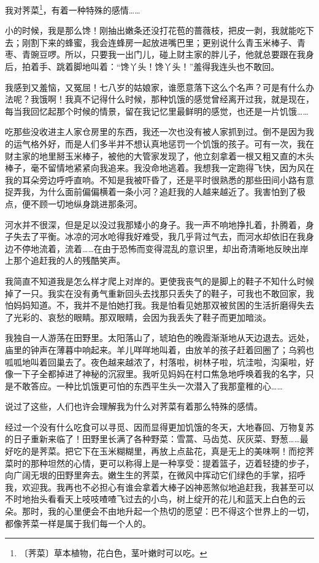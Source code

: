 \documentclass[12pt,UTF-8,openany]{ctexbook}
\begin{document}
\begin{normalsize}
    
    我对荠菜\footnote{〔荠菜〕草本植物，花白色，茎叶嫩时可以吃。}，有着一种特殊的感情……
    
    小的时候，我是那么馋！刚抽出嫩条还没打花苞的蔷薇枝，把皮一剥，我就能吃下去；刚割下来的蜂蜜，我会连蜂房一起放进嘴巴里；更别说什么青玉米棒子、青枣、青豌豆啰。所以，只要我一出门儿，碰上财主家的胖儿子，他就总要跟在我身后，拍着手、跳着脚地叫着：“馋丫头！馋丫头！”羞得我连头也不敢回。
    
    我感到又羞恼，又冤屈！七八岁的姑娘家，谁愿意落下这么个名声？可是有什么办法呢？我饿啊！我真不记得什么时候，那种饥饿的感觉曾经离开过我，就是现在，每当我回忆起那个时候的情景，留在我记忆里最鲜明的感觉，也还是一片饥饿……
    
    吃那些没收进主人家仓房里的东西，我还一次也没有被人家抓到过。倒不是因为我的运气格外好，而是人们多半并不想认真地惩罚一个饥饿的孩子。可有一次，我在财主家的地里掰玉米棒子，被他的大管家发现了，他立刻拿着一根又粗又直的木头棒子，毫不留情地紧紧向我追来。我没命地逃着。我想我一定跑得飞快，因为风在我的耳朵旁边呼呼直响。不知是我被吓昏了，还是平时很熟悉的那些田间小路有意捉弄我，为什么面前偏偏横着一条小河？追赶我的人越来越近了。我害怕到了极点，便不顾一切地纵身跳进那条河。
    
    河水并不很深，但是足以没过我那矮小的身子。我一声不响地挣扎着，扑腾着，身子失去了平衡。冰凉的河水呛得我好难受，我几乎背过气去，而河水却依旧在我身边不停地流着，流着……在由于恐怖而变得混乱的意识里，却出奇清晰地反映出岸上那个追赶我的人的残酷笑声。
    
    我简直不知道我是怎么样才爬上对岸的。更使我丧气的是脚上的鞋子不知什么时候掉了一只。我实在没有勇气重新回头去找那只丢失了的鞋子，可我也不敢回家，我怕妈妈知道。不，我并不是怕她打我。我是怕看见她那双被贫困的生活折磨得失去了光彩的、哀愁的眼睛。那双眼睛，会因为我丢失了鞋子而更加暗淡。
    
    我独自一人游荡在田野里。太阳落山了，琥珀色的晚霞渐渐地从天边退去。远处，庙里的钟声在薄暮中响起来。羊儿咩咩地叫着，由放羊的孩子赶着回圈了；乌鸦也呱呱地叫着回巢去了。夜色越来越浓了，村落啦，树林子啦，坑洼啦，沟渠啦，好像一下子全都掉进了神秘的沉寂里。我听见妈妈在村口焦急地呼唤着我的名字，只是不敢答应。一种比饥饿更可怕的东西平生头一次潜入了我那童稚的心……
    
    说过了这些，人们也许会理解我为什么对荠菜有着那么特殊的感情。
    
    经过一个没有什么吃食可以寻觅、因而显得更加饥饿的冬天，大地春回、万物复苏的日子重新来临了！田野里长满了各种野菜：雪蒿、马齿苋、灰灰菜、野葱……最好吃的是荠菜。把它下在玉米糊糊里，再放上点盐花，真是无上的美味啊！而挖荠菜时的那种坦然的心情，更可以称得上是一种享受：提着篮子，迈着轻捷的步子，向广阔无垠的田野里奔去。嫩生生的荠菜，在微风中挥动它们绿色的手掌，招呼我，欢迎我。我再也不必担心有谁会拿着大棒子凶神恶煞似地追赶我，我甚至可以不时地抬头看看天上吱吱喳喳飞过去的小鸟，树上绽开的花儿和蓝天上白色的云朵。那时，我的心里便会不由地升起一个热切的愿望：巴不得这个世界上的一切，都像荠菜一样是属于我们每一个人的。
    

\end{normalsize}
\end{document}
